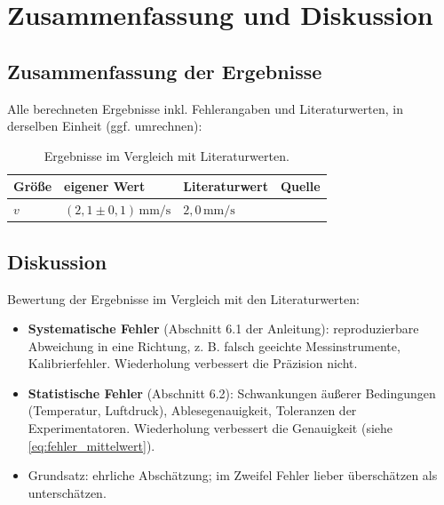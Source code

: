 \section{Zusammenfassung und Diskussion}
\label{sec:diskussion}

\subsection{Zusammenfassung der Ergebnisse}
Alle berechneten Ergebnisse inkl. Fehlerangaben und Literaturwerten,
in derselben Einheit (ggf. umrechnen):

\begin{table}[H]
  \centering
  \caption{Ergebnisse im Vergleich mit Literaturwerten.}
  \label{tab:ergebnisse}
  \begin{tabular}{llll}
    \toprule
    Größe & eigener Wert & Literaturwert & Quelle \\
    \midrule
    $v$ & $(2{,}1 \pm 0{,}1)\,\si{\milli\meter\per\second}$
        & $2{,}0\,\si{\milli\meter\per\second}$ & \cite{Example2023} \\
    \bottomrule
  \end{tabular}
\end{table}

\subsection{Diskussion}
Bewertung der Ergebnisse im Vergleich mit den Literaturwerten:

\begin{itemize}
  \item \textbf{Systematische Fehler} (Abschnitt 6.1 der Anleitung):
        reproduzierbare Abweichung in eine Richtung, z. B. falsch
        geeichte Messinstrumente, Kalibrierfehler. Wiederholung
        verbessert die Präzision nicht.
  \item \textbf{Statistische Fehler} (Abschnitt 6.2): Schwankungen
        äußerer Bedingungen (Temperatur, Luftdruck), Ablesegenauigkeit,
        Toleranzen der Experimentatoren. Wiederholung verbessert die
        Genauigkeit (siehe \cref{eq:fehler_mittelwert}).
  \item Grundsatz: ehrliche Abschätzung; im Zweifel Fehler lieber
        überschätzen als unterschätzen.
\end{itemize}
